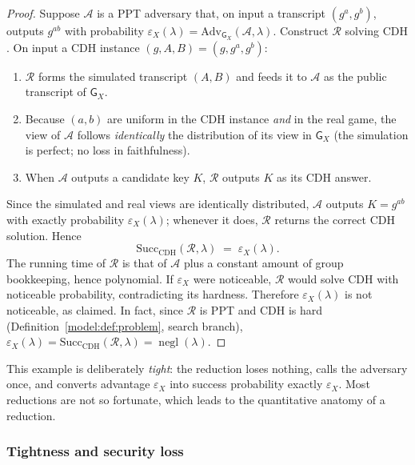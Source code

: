 \documentclass[11pt,a4paper]{article}
\theoremstyle{definition}
\theoremstyle{remark}
\DeclareMathOperator{\negl}{negl}
\begin{document}
\begin{proof}
Suppose \(\mathcal{A}\) is a PPT adversary that, on input a transcript
\((g^a, g^b)\), outputs \(g^{ab}\) with probability
\(\varepsilon_X(\lambda)=\mathrm{Adv}_{\mathsf{G}_X}(\mathcal{A},\lambda)\).
Construct \(\mathcal{R}\) solving \(\mathrm{CDH}\). On input a \(\mathrm{CDH}\)
instance \((g, A, B) = (g, g^a, g^b)\):
\begin{enumerate}
\item \(\mathcal{R}\) forms the simulated transcript \((A, B)\) and feeds it to
  \(\mathcal{A}\) as the public transcript of \(\mathsf{G}_X\).
\item Because \((a,b)\) are uniform in the \(\mathrm{CDH}\) instance \emph{and} in
  the real game, the view of \(\mathcal{A}\) follows \emph{identically} the
  distribution of its view in \(\mathsf{G}_X\) (the simulation is perfect; no loss in
  faithfulness).
\item When \(\mathcal{A}\) outputs a candidate key \(K\), \(\mathcal{R}\) outputs
  \(K\) as its \(\mathrm{CDH}\) answer.
\end{enumerate}
Since the simulated and real views are identically distributed,
\(\mathcal{A}\) outputs \(K = g^{ab}\) with exactly probability
\(\varepsilon_X(\lambda)\); whenever it does, \(\mathcal{R}\) returns the correct
\(\mathrm{CDH}\) solution. Hence
\[
  \mathrm{Succ}_{\mathrm{CDH}}(\mathcal{R},\lambda)
  \;=\; \varepsilon_X(\lambda).
\]
The running time of \(\mathcal{R}\) is that of \(\mathcal{A}\) plus a constant
amount of group bookkeeping, hence polynomial. If \(\varepsilon_X\) were
noticeable, \(\mathcal{R}\) would solve \(\mathrm{CDH}\) with noticeable
probability, contradicting its hardness. Therefore \(\varepsilon_X(\lambda)\) is
not noticeable, as claimed. In fact, since \(\mathcal{R}\) is PPT and
\(\mathrm{CDH}\) is hard (Definition~\ref{model:def:problem}, search branch),
\(\varepsilon_X(\lambda) = \mathrm{Succ}_{\mathrm{CDH}}(\mathcal{R},\lambda) =
\negl(\lambda)\).
\end{proof}

This example is deliberately \emph{tight}: the reduction loses nothing, calls the
adversary once, and converts advantage \(\varepsilon_X\) into success probability
exactly \(\varepsilon_X\). Most reductions are not so fortunate, which leads to
the quantitative anatomy of a reduction.

\subsubsection{Tightness and security loss}
\end{document}
